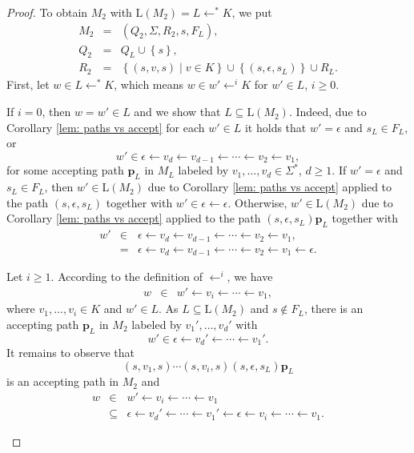 \documentclass{ws-ijmpc}
\begin{document}
\begin{proof}
To obtain $M_{2}$ with $\mathrm{L}\!\left(M_{2}\right)=L\leftarrow^{*}K$,
we put 
\begin{eqnarray*}
M_{2} & = & \left(Q_{2},\Sigma,R_{2},s,F_{L}\right),\\
Q_{2} & = & Q_{L}\cup\left\{ s\right\} ,\\
R_{2} & = & \left\{ \left(s,v,s\right)\mid v\in K\right\} \cup\left\{ \left(s,\epsilon,s_{L}\right)\right\} \cup R_{L}.
\end{eqnarray*}
First, let $w\in L\leftarrow^{*}K$, which means $w\in w'\leftarrow^{i}K$
for $w'\in L$, $i\ge0$.
\begin{romanlist}
\item If $i=0$, then $w=w'\in L$ and we show that $L\subseteq\mathrm{L}\!\left(M_{2}\right)$.
Indeed, due to Corollary \ref{lem: paths vs accept} for each $w'\in L$
it holds that $w'=\epsilon$ and $s_{L}\in F_{L}$, or 
\begin{equation}
w'\in\epsilon\leftarrow v_{d}\leftarrow v_{d-1}\leftarrow\cdots\leftarrow v_{2}\leftarrow v_{1},\label{eq:comp-1}
\end{equation}
for some accepting path $\mathbf{p}_{L}$ in $M_{L}$ labeled by $v_{1},\dots,v_{d}\in\Sigma^{*}$,
$d\ge1$. If $w'=\epsilon$ and $s_{L}\in F_{L}$, then $w'\in\mathrm{L}\!\left(M_{2}\right)$
due to Corollary \ref{lem: paths vs accept} applied to the path $\left(s,\epsilon,s_{L}\right)$
together with $w'\in\epsilon\leftarrow\epsilon$. Otherwise, $w'\in\mathrm{L}\!\left(M_{2}\right)$
due to Corollary \ref{lem: paths vs accept} applied to the path $\left(s,\epsilon,s_{L}\right)\mathbf{p}_{L}$
together with
\begin{eqnarray*}
w' & \in & \epsilon\leftarrow v_{d}\leftarrow v_{d-1}\leftarrow\cdots\leftarrow v_{2}\leftarrow v_{1},\\
 & = & \epsilon\leftarrow v_{d}\leftarrow v_{d-1}\leftarrow\cdots\leftarrow v_{2}\leftarrow v_{1}\leftarrow\epsilon.
\end{eqnarray*}

\item Let $i\ge1$. According to the definition of $\leftarrow^{i}$, we
have 
\begin{eqnarray*}
w & \in & w'\leftarrow v_{i}\leftarrow\cdots\leftarrow v_{1},
\end{eqnarray*}
where $v_{1},\dots,v_{i}\in K$ and $w'\in L$. As $L\subseteq\mathrm{L}\!\left(M_{2}\right)$
and $s\notin F_{L}$, there is an accepting path $\mathbf{p}_{L}$
in $M_{2}$ labeled by $v_{1}',\dots,v_{d}'$ with
\[
w'\in\epsilon\leftarrow v_{d}'\leftarrow\cdots\leftarrow v_{1}'.
\]
It remains to observe that 
\[
\left(s,v_{1},s\right)\cdots\left(s,v_{i},s\right)\left(s,\epsilon,s_{L}\right)\mathbf{p}_{L}
\]
is an accepting path in $M_{2}$ and 
\begin{eqnarray*}
w & \in & w'\leftarrow v_{i}\leftarrow\cdots\leftarrow v_{1}\\
 & \subseteq & \epsilon\leftarrow v_{d}'\leftarrow\cdots\leftarrow v_{1}'\leftarrow\epsilon\leftarrow v_{i}\leftarrow\cdots\leftarrow v_{1}.
\end{eqnarray*}


\end{romanlist}
\end{proof}
\end{document}
